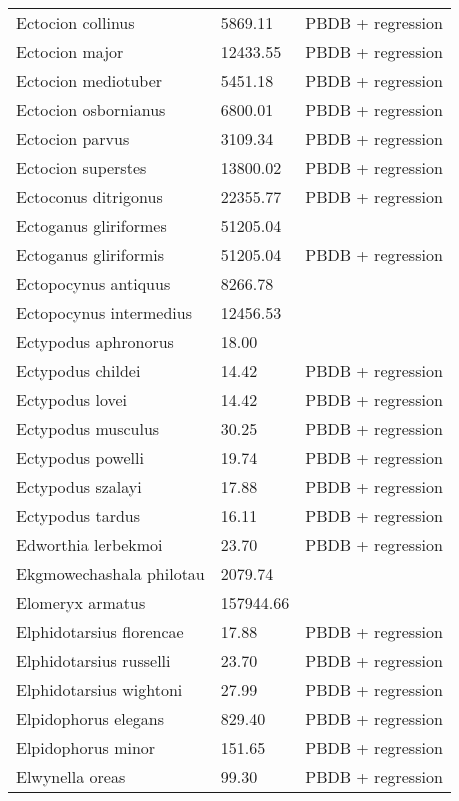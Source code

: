 \documentclass{article}
\begin{document}
\begin{center}
\begin{longtable}{p{} p{} p{}}
    Ectocion collinus & 5869.11 & PBDB + regression \\ 
    Ectocion major & 12433.55 & PBDB + regression \\ 
    Ectocion mediotuber & 5451.18 & PBDB + regression \\ 
    Ectocion osbornianus & 6800.01 & PBDB + regression \\ 
    Ectocion parvus & 3109.34 & PBDB + regression \\ 
    Ectocion superstes & 13800.02 & PBDB + regression \\ 
    Ectoconus ditrigonus & 22355.77 & PBDB + regression \\ 
    Ectoganus gliriformes & 51205.04 & \cite{Novacek1977} \\ 
    Ectoganus gliriformis & 51205.04 & PBDB + regression \\ 
    Ectopocynus antiquus & 8266.78 & \cite{Tomiya2013} \\ 
    Ectopocynus intermedius & 12456.53 & \cite{Tomiya2013} \\ 
    Ectypodus aphronorus & 18.00 & \cite{Wilson2012} \\ 
    Ectypodus childei & 14.42 & PBDB + regression \\ 
    Ectypodus lovei & 14.42 & PBDB + regression \\ 
    Ectypodus musculus & 30.25 & PBDB + regression \\ 
    Ectypodus powelli & 19.74 & PBDB + regression \\ 
    Ectypodus szalayi & 17.88 & PBDB + regression \\ 
    Ectypodus tardus & 16.11 & PBDB + regression \\ 
    Edworthia lerbekmoi & 23.70 & PBDB + regression \\ 
    Ekgmowechashala philotau & 2079.74 & \cite{Tomiya2013} \\ 
    Elomeryx armatus & 157944.66 & \cite{Tomiya2013} \\ 
    Elphidotarsius florencae & 17.88 & PBDB + regression \\ 
    Elphidotarsius russelli & 23.70 & PBDB + regression \\ 
    Elphidotarsius wightoni & 27.99 & PBDB + regression \\ 
    Elpidophorus elegans & 829.40 & PBDB + regression \\ 
    Elpidophorus minor & 151.65 & PBDB + regression \\ 
    Elwynella oreas & 99.30 & PBDB + regression \\ 

\end{longtable}
\end{center}
\end{document}
